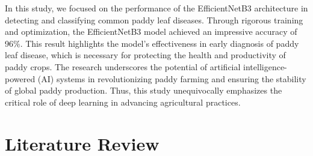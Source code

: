 \documentclass[conference]{IEEEtran}
\begin{document}
In this study, we focused on the performance of the EfficientNetB3 architecture in detecting and classifying common paddy leaf diseases. Through rigorous training and optimization, the EfficientNetB3 model achieved an impressive accuracy of 96\%. This result highlights the model's effectiveness in early diagnosis of paddy leaf disease, which is necessary for protecting the health and productivity of paddy crops. The research underscores the potential of artificial intelligence-powered (AI) systems in revolutionizing paddy farming and ensuring the stability of global paddy production. Thus, this study unequivocally emphasizes the critical role of deep learning in advancing agricultural practices.

\section{Literature Review}
\end{document}

